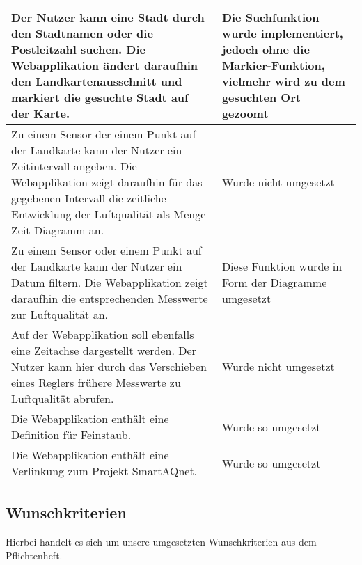 \begin{tabularx}{\textwidth}{| X | X |}
        \hline
        Der Nutzer kann eine Stadt durch den Stadtnamen oder die Postleitzahl suchen. 
        Die Webapplikation ändert daraufhin den Landkartenausschnitt und markiert die gesuchte Stadt auf der Karte. & Die Suchfunktion wurde implementiert, jedoch ohne die Markier-Funktion, vielmehr wird zu dem gesuchten Ort gezoomt \\
        \hline
        Zu einem Sensor der einem Punkt auf der Landkarte kann der Nutzer ein Zeitintervall angeben. Die Webapplikation zeigt daraufhin für das gegebenen Intervall 
        die zeitliche Entwicklung der Luftqualität als Menge-Zeit Diagramm an. & Wurde nicht umgesetzt \\
        \hline
        Zu einem Sensor oder einem Punkt auf der Landkarte kann der Nutzer ein Datum filtern. 
        Die Webapplikation zeigt daraufhin die entsprechenden Messwerte zur Luftqualität an. & Diese Funktion wurde in Form der Diagramme umgesetzt \\
        \hline
        Auf der Webapplikation soll ebenfalls eine Zeitachse dargestellt werden. 
        Der Nutzer kann hier durch das Verschieben eines Reglers frühere Messwerte zu Luftqualität abrufen.  & Wurde nicht umgesetzt \\
        \hline
        Die Webapplikation enthält eine Definition für Feinstaub. & Wurde so umgesetzt \\
        \hline
        Die Webapplikation enthält eine Verlinkung zum Projekt SmartAQnet. & Wurde so umgesetzt \\ 
        \hline
    \end{tabularx}
\subsection{Wunschkriterien}
    Hierbei handelt es sich um unsere umgesetzten Wunschkriterien aus dem Pflichtenheft.
    
